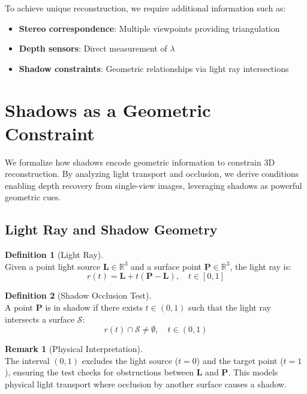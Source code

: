 \documentclass[12pt]{article}
\newcommand{\R}{\mathbb{R}}
\newcommand{\vect}[1]{\bm{#1}}
\theoremstyle{definition}
\newtheorem{definition}{Definition}[subsection]
\newtheorem{remark}{Remark}[subsection]
\begin{document}
To achieve unique reconstruction, we require additional information such as:
\begin{itemize}
    \item \textbf{Stereo correspondence}: Multiple viewpoints providing triangulation
    \item \textbf{Depth sensors}: Direct measurement of $\lambda$
    \item \textbf{Shadow constraints}: Geometric relationships via light ray intersections
\end{itemize}

\section{Shadows as a Geometric Constraint} \label{sec:shadows}

We formalize how shadows encode geometric information to constrain 3D reconstruction. By analyzing light transport and occlusion, we derive conditions enabling depth recovery from single-view images, leveraging shadows as powerful geometric cues.

\subsection{Light Ray and Shadow Geometry} \label{sec:light_ray_geometry}

\begin{definition}[Light Ray] \label{def:light_ray} ~\\
Given a point light source $\vect{L} \in \R^3$ and a surface point $\vect{P} \in \R^3$, the light ray is:
\begin{equation}
\boxed{r(t) = \vect{L} + t(\vect{P} - \vect{L}), \quad t \in [0,1]} \label{eq:light_ray}
\end{equation}
\end{definition}

\begin{definition}[Shadow Occlusion Test] \label{def:shadow_occlusion} ~\\
A point $\vect{P}$ is in shadow if there exists $t \in (0,1)$ such that the light ray intersects a surface $\mathcal{S}$:
\begin{equation}
\boxed{r(t) \cap \mathcal{S} \neq \emptyset, \quad t \in (0,1)}
\end{equation}
\end{definition}

\begin{remark}[Physical Interpretation] \label{rmk:occlusion_physics} ~\\
The interval $(0,1)$ excludes the light source ($t=0$) and the target point ($t=1$), ensuring the test checks for obstructions between $\vect{L}$ and $\vect{P}$. This models physical light transport where occlusion by another surface causes a shadow.
\end{remark}
\end{document}
